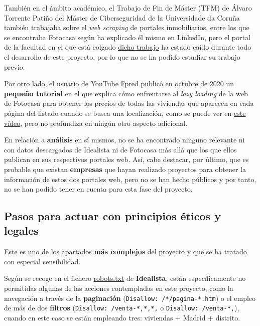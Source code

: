 \documentclass[12pt]{article}
\begin{document}
También en el ámbito académico, el Trabajo de Fin de Máster (TFM) de Álvaro Torrente Patiño del Máster de Ciberseguridad de la Universidade da Coruña también trabajaba sobre el \textit{web scraping} de portales inmobiliarios, entre los que se encontraba Fotocasa según ha explicado él mismo en LinkedIn, pero el portal de la facultad en el que está colgado \href{http://castor.det.uvigo.es:8080/xmlui/bitstream/handle/123456789/575/TorrentePatino_Alvaro_TFM_2021.pdf?sequence=1&isAllowed=y}{dicho trabajo} ha estado caído durante todo el desarrollo de este proyecto, por lo que no se ha podido estudiar su trabajo previo. 

Por otro lado, el usuario de YouTube Fpred publicó en octubre de 2020 un \textbf{pequeño tutorial} en el que explica cómo enfrentarse al \textit{lazy loading} de la web de Fotocasa para obtener los precios de todas las viviendas que aparecen en cada página del listado cuando se busca una localización, como se puede ver en \href{https://www.youtube.com/watch?v=WMjV7rF3oX8}{este vídeo}, pero no profundiza en ningún otro aspecto adicional. 

En relación a \textbf{análisis} en sí mismos, no se ha encontrado ninguno relevante ni con datos descargados de Idealista ni de Fotocasa más allá que los que ellos publican en sus respectivos portales web. Así, cabe destacar, por último, que es probable que existan \textbf{empresas} que hayan realizado proyectos para obtener la información de estos dos portales web, pero no se han hecho públicos y por tanto, no se han podido tener en cuenta para esta fase del proyecto. 

\vspace{-1.5em}\subsection*{Pasos para actuar con principios éticos y legales}\vspace{-1.0em}

Este es uno de los apartados \textbf{más complejos} del proyecto y que se ha tratado con especial sensibilidad.

Según se recoge en el fichero \href{https://www.idealista.com/robots.txt}{robots.txt} de \textbf{Idealista}, están específicamente no permitidas algunas de las acciones contempladas en este proyecto, como la navegación a través de la \textbf{paginación} (\verb|Disallow: /*/pagina-*.htm|) o el empleo de más de dos \textbf{filtros} (\verb|Disallow: /venta-*,*,*,| o \verb|Disallow: /venta-*,|), cuando en este caso se están empleando tres: viviendas + Madrid + distrito. 
\end{document}
